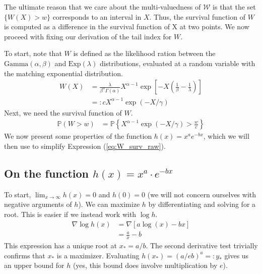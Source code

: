 \documentclass{article}
\newcommand{\bP}{\mathbb{P}}
\newcommand{\sW}{\mathscr{W}}
\begin{document}
The ultimate reason that we care about the multi-valuedness of $\sW$ is that the set $\{ W(X) > w \}$ corresponds to an interval in $X$. Thus, the survival function of $W$ is computed as a difference in the survival function of X at two points. We now proceed with fixing our derivation of the tail index for $W$.

To start, note that $W$ is defined as the likelihood ration between the $\mathrm{Gamma}(\alpha, \beta)$ and $\mathrm{Exp}(\lambda)$ distributions, evaluated at a random variable with the matching exponential distribution. 
%
\begin{align}
    W(X) &= \frac{\lambda}{\beta^\alpha \Gamma(\alpha)} X^{\alpha - 1} \exp\left[ -X \left( \frac{1}{\beta} - \frac{1}{\lambda} \right) \right]\\
    &=: c X^{\alpha - 1} \exp(-X / \gamma) \label{eq:W_of_X}
\end{align}
%
Next, we need the survival function of $W$.
%
\begin{align}
    \bP(W > w) &= \bP \left\{ X^{\alpha - 1} \exp(-X / \gamma) > \frac{w}{c} \right\} \label{eq:W_surv_raw}
\end{align}
%
We now present some properties of the function $h(x) = x^a e^{-bx}$, which we will then use to simplify Expression (\ref{eq:W_surv_raw}).

\subsection{On the function $h(x) = x^a \cdot e^{-bx}$}

To start, $\lim_{x \rightarrow \infty} h(x) = 0$ and $h(0) = 0$ (we will not concern ourselves with negative arguments of $h$). We can maximize $h$ by differentiating and solving for a root. This is easier if we instead work with $\log h$.
%
\begin{align}
    \nabla \log h(x) &= \nabla \left[ a \log(x) - b x \right]\\
    &= \frac{a}{x} - b \label{eq:grad_log_h}
\end{align}
%
This expression has a unique root at $x_* = a/b$. The second derivative test trivially confirms that $x_*$ is a maximizer. Evaluating $h(x_*) = (a/eb)^a=: y_*$ gives us an upper bound for $h$ (yes, this bound does involve multiplication by $e$).
\end{document}
